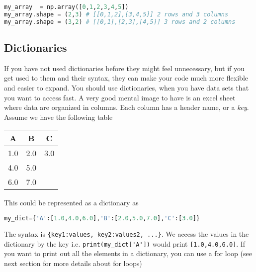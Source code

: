 \documentclass[graybox,sectrefs,envcountresetchap,open=right,final]{svmonodo}
\begin{document}
\begin{lstlisting}[language=python,style=blue1bar]
my_array  = np.array([0,1,2,3,4,5])
my_array.shape = (2,3) # [[0,1,2],[3,4,5]] 2 rows and 3 columns
my_array.shape = (3,2) # [[0,1],[2,3],[4,5]] 3 rows and 2 columns

\end{lstlisting}


\subsection{Dictionaries}
If you have not used dictionaries before they might feel unnecessary, but if you get used to them and their syntax, they can make your code much more flexible and easier to expand. You should use dictionaries, when you have data sets that you want to access fast. A very good mental image to have is an excel sheet where data are organized in columns. Each column has a header name, or a \emph{key}. Assume we have the following table



{\small   %

\vspace{4mm}

\begin{tabular}{ccc}
\hline
\multicolumn{1}{c}{ A } & \multicolumn{1}{c}{ B } & \multicolumn{1}{c}{ C } \\
\hline
1.0 & 2.0 & 3.0 \\
4.0 & 5.0 &     \\
6.0 & 7.0 &     \\
\hline
\end{tabular}

\vspace{4mm}

}


\noindent
This could be represented as a dictionary as


\begin{lstlisting}[language=python,style=blue1bar]
my_dict={'A':[1.0,4.0,6.0],'B':[2.0,5.0,7.0],'C':[3.0]}

\end{lstlisting}

The syntax is \Verb!{key1:values, key2:values2, ...}!. We access the values in the dictionary by the key i.e. \Verb!print(my_dict['A'])! would print \texttt{[1.0,4.0,6.0]}. If you want to print out all the elements in a dictionary, you can use a for loop (see next section for more details about for loops)
\end{document}
